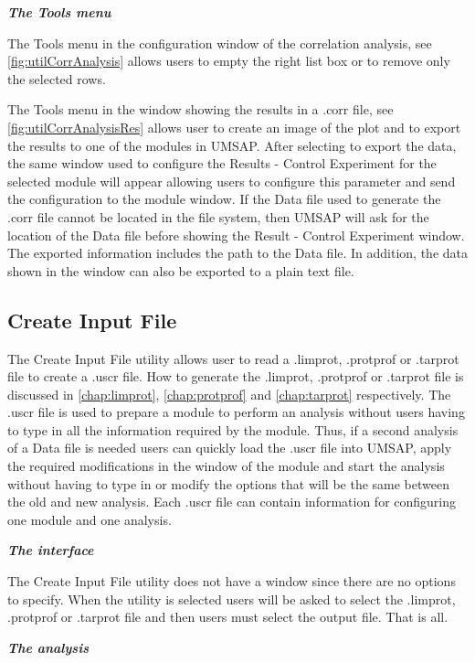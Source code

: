 \textit{\textbf{The Tools menu}}

The Tools menu in the configuration window of the correlation analysis, see \autoref{fig:utilCorrAnalysis} allows users to empty the right list box or to remove only the selected rows.

The Tools menu in the window showing the results in a .corr file, see \autoref{fig:utilCorrAnalysisRes} allows user to create an image of the plot and to export the results to one of the modules in UMSAP. After selecting to export the data, the same window used to configure the Results - Control Experiment for the selected module will appear allowing users to configure this parameter and send the configuration to the module window. If the Data file used to generate the .corr file cannot be located in the file system, then UMSAP will ask for the location of the Data file before showing the Result - Control Experiment window. The exported information includes the path to the Data file. In addition, the data shown in the window can also be exported to a plain text file. 

\subsection{Create Input File}
\label{subsec:utilUscrFile}

The Create Input File utility allows user to read a .limprot, .protprof or .tarprot file to create a .uscr file. How to generate the .limprot, .protprof or .tarprot file is discussed in \autoref{chap:limprot}, \autoref{chap:protprof} and \autoref{chap:tarprot} respectively. The .uscr file is used to prepare a module to perform an analysis without users having to type in all the information required by the module. Thus, if a second analysis of a Data file is needed users can quickly load the .uscr file into UMSAP, apply the required modifications in the window of the module and start the analysis without having to type in or modify the options that will be the same between the old and new analysis. Each .uscr file can contain information for configuring one module and one analysis.

\textit{\textbf{The interface}}

The Create Input File utility does not have a window since there are no options to specify. When the utility is selected users will be asked to select the .limprot, .protprof or .tarprot file and then users must select the output file. That is all.

\textit{\textbf{The analysis}}

